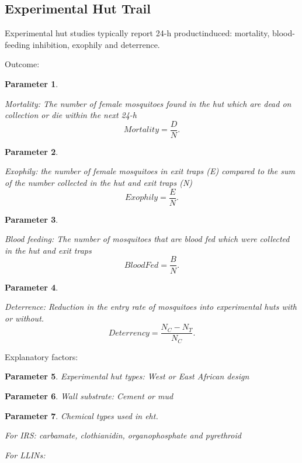 \documentclass[a4paper, 12pt, twoside]{article}
\newtheorem{parameter}{Parameter}
\begin{document}
\subsection{Experimental Hut Trail}

Experimental hut studies typically report 24-h productinduced: mortality, blood-feeding inhibition, exophily and deterrence.

Outcome:

\begin{parameter}
	\label{eht:mortality}

	Mortality: The number of female mosquitoes found in the hut which are dead on collection or die within the next 24-h
	\[
		Mortality = \frac{D}{N}
		.\]
\end{parameter}


\begin{parameter}
	\label{eht:exophily}

	Exophily: the number of female mosquitoes in exit traps (E) compared to the sum of the number collected in the hut and exit traps (N)
	\[
		Exophily = \frac{E}{N}
		.\]

\end{parameter}

\begin{parameter}
	\label{eht:blood_fed}

	Blood feeding: The number of mosquitoes that are blood fed which were collected in the hut and exit traps
	\[
		BloodFed = \frac{B}{N}
		.\]
\end{parameter}

\begin{parameter}
	\label{eht:Deterrence}

	Deterrence: Reduction in the entry rate of mosquitoes into experimental huts with or without.
	\[
		Deterrency = \frac{N_C - N_T}{N_C}
		.\]
\end{parameter}

Explanatory factors:

\begin{parameter}
	\label{eht:experimental_hut_types}
	Experimental hut types: West or East African design

\end{parameter}

\begin{parameter}
	\label{eht:wall_substrate}
	Wall substrate: Cement or mud

\end{parameter}

\begin{parameter}
	\label{eht:chemical_class_used}
	Chemical types used in \gls{eht}.

	For IRS: carbamate, clothianidin, organophosphate and pyrethroid

	For LLINs:

\end{parameter}
\end{document}
